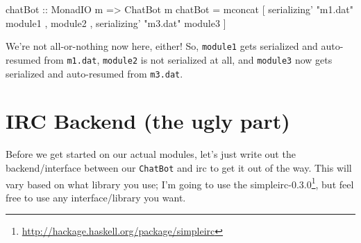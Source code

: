 \documentclass[]{article}
\newenvironment{Shaded}{}{}
\newcommand{\DataTypeTok}[1]{\textcolor[rgb]{0.56,0.13,0.00}{{#1}}}
\newcommand{\StringTok}[1]{\textcolor[rgb]{0.25,0.44,0.63}{{#1}}}
\newcommand{\OtherTok}[1]{\textcolor[rgb]{0.00,0.44,0.13}{{#1}}}
\newcommand{\FunctionTok}[1]{\textcolor[rgb]{0.02,0.16,0.49}{{#1}}}
\newcommand{\NormalTok}[1]{{#1}}
\renewcommand{\href}[2]{#2\footnote{\url{#1}}}
\begin{document}
\begin{Shaded}
\begin{Highlighting}[]
\OtherTok{chatBot ::} \DataTypeTok{MonadIO} \NormalTok{m }\OtherTok{=>} \DataTypeTok{ChatBot} \NormalTok{m}
\NormalTok{chatBot }\FunctionTok{=} \NormalTok{mconcat [ serializing' }\StringTok{"m1.dat"} \NormalTok{module1}
                  \NormalTok{, module2}
                  \NormalTok{, serializing' }\StringTok{"m3.dat"} \NormalTok{module3}
                  \NormalTok{]}
\end{Highlighting}
\end{Shaded}

We're not all-or-nothing now here, either! So, \texttt{module1} gets serialized and auto-resumed
from \texttt{m1.dat}, \texttt{module2} is not serialized at all, and \texttt{module3} now gets
serialized and auto-resumed from \texttt{m3.dat}.

\section{IRC Backend (the ugly part)}\label{irc-backend-the-ugly-part}

Before we get started on our actual modules, let's just write out the backend/interface between our
\texttt{ChatBot} and irc to get it out of the way. This will vary based on what library you use; I'm
going to use the \href{http://hackage.haskell.org/package/simpleirc}{simpleirc-0.3.0}, but feel free
to use any interface/library you want.
\end{document}
